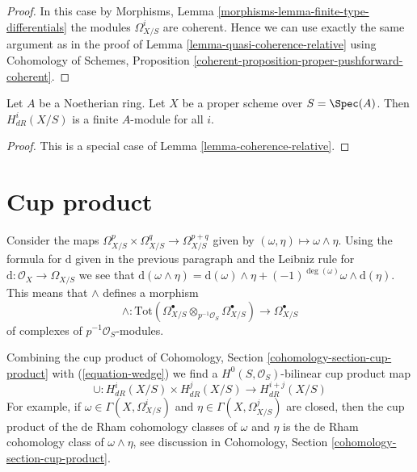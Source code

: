 \begin{proof}
In this case by Morphisms, Lemma \ref{morphisms-lemma-finite-type-differentials}
the modules $\Omega^i_{X/S}$ are coherent. Hence we can use exactly the
same argument as in the proof of Lemma \ref{lemma-quasi-coherence-relative}
using Cohomology of Schemes, Proposition
\ref{coherent-proposition-proper-pushforward-coherent}.
\end{proof}

\begin{lemma}
\label{lemma-finite-de-Rham}
Let $A$ be a Noetherian ring. Let $X$ be a proper scheme over $S = \Spec(A)$.
Then $H^i_{dR}(X/S)$ is a finite $A$-module for all $i$.
\end{lemma}

\begin{proof}
This is a special case of Lemma \ref{lemma-coherence-relative}.
\end{proof}





\section{Cup product}
\label{section-cup-product}

\noindent
Consider the maps
$\Omega^p_{X/S} \times \Omega^q_{X/S} \to \Omega^{p + q}_{X/S}$
given by $(\omega , \eta) \longmapsto \omega \wedge \eta$.
Using the formula for $\text{d}$ given in the previous paragraph
and the Leibniz rule for $\text{d} : \mathcal{O}_X \to \Omega_{X/S}$
we see that $\text{d}(\omega \wedge \eta) = \text{d}(\omega) \wedge \eta +
(-1)^{\deg(\omega)} \omega \wedge \text{d}(\eta)$. This means that
$\wedge$ defines a morphism
\begin{equation}
\label{equation-wedge}
\wedge :
\text{Tot}(
\Omega^\bullet_{X/S} \otimes_{p^{-1}\mathcal{O}_S} \Omega^\bullet_{X/S})
\longrightarrow
\Omega^\bullet_{X/S}
\end{equation}
of complexes of $p^{-1}\mathcal{O}_S$-modules.

\medskip\noindent
Combining the cup product of
Cohomology, Section \ref{cohomology-section-cup-product}
with (\ref{equation-wedge}) we find a
$H^0(S, \mathcal{O}_S)$-bilinear cup product map
$$
\cup : H^i_{dR}(X/S) \times H^j_{dR}(X/S) \longrightarrow H^{i + j}_{dR}(X/S)
$$
For example, if $\omega \in \Gamma(X, \Omega^i_{X/S})$ and
$\eta \in \Gamma(X, \Omega^j_{X/S})$ are closed, then
the cup product of the de Rham cohomology classes of
$\omega$ and $\eta$ is the de Rham cohomology class of $\omega \wedge \eta$,
see discussion in Cohomology, Section \ref{cohomology-section-cup-product}.

